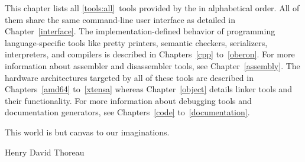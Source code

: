 




\renewcommand{\flowgraph}[1]{}
\rohead{\topmark{ -- }\botmark}
\newcommand{\seeprefix}{}\renewcommand{\seedocumentationref}[3]{\seeprefix{}\documentationref{#2}{#3}\renewcommand{\seeprefix}{/}}
\renewcommand{\toolsection}[1]{\normalfont\par\medskip\noindent\textbf{#1}\refstepcounter{tool}\phantomsection\addcontentsline{toc}{section}{#1}\markboth{}{\ifodd\thepage#1\else\botmark\fi}\index[tools]{#1 tool@\tool{#1} tool}\renewcommand{\seeprefix}{\em\alignright\mbox{See Chapter }}}


This chapter lists all \ref*{tools:all}~tools provided by the \ecs{} in alphabetical order.
All of them share the same command-line user interface as detailed in Chapter~\ref{interface}.
The implementation-defined behavior of programming language-specific tools like pretty printers, semantic checkers, serializers, interpreters, and compilers is described in Chapters~\ref{cpp} to~\ref{oberon}.
For more information about assembler and disassembler tools, see Chapter~\ref{assembly}.
The hardware architectures targeted by all of these tools are described in Chapters~\ref{amd64} to~\ref{xtensa} whereas Chapter~\ref{object} details linker tools and their functionality.
For more information about debugging tools and documentation generators, see Chapters~\ref{code} to~\ref{documentation}.

\epigraph{This world is but canvas to our imaginations.}{Henry David Thoreau}

